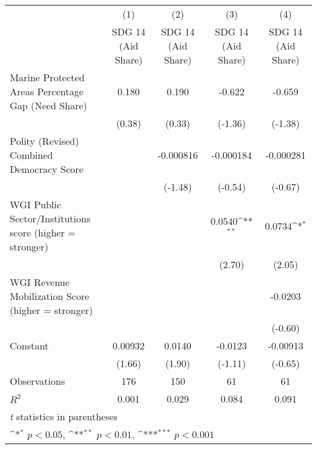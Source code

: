 {
\def\sym#1{\ifmmode^{#1}\else\(^{#1}\)\fi}
\begin{tabular}{l*{4}{c}}
\hline\hline
                &\multicolumn{1}{c}{(1)}&\multicolumn{1}{c}{(2)}&\multicolumn{1}{c}{(3)}&\multicolumn{1}{c}{(4)}\\
                &\multicolumn{1}{c}{SDG 14 (Aid Share)}&\multicolumn{1}{c}{SDG 14 (Aid Share)}&\multicolumn{1}{c}{SDG 14 (Aid Share)}&\multicolumn{1}{c}{SDG 14 (Aid Share)}\\
\hline
Marine Protected Areas Percentage Gap (Need Share)&    0.180         &    0.190         &   -0.622         &   -0.659         \\
                &   (0.38)         &   (0.33)         &  (-1.36)         &  (-1.38)         \\
[1em]
Polity (Revised) Combined Democracy Score&                  &-0.000816         &-0.000184         &-0.000281         \\
                &                  &  (-1.48)         &  (-0.54)         &  (-0.67)         \\
[1em]
WGI Public Sector/Institutions score (higher = stronger)&                  &                  &   0.0540\sym{**} &   0.0734\sym{*}  \\
                &                  &                  &   (2.70)         &   (2.05)         \\
[1em]
WGI Revenue Mobilization Score (higher = stronger)&                  &                  &                  &  -0.0203         \\
                &                  &                  &                  &  (-0.60)         \\
[1em]
Constant        &  0.00932         &   0.0140         &  -0.0123         & -0.00913         \\
                &   (1.66)         &   (1.90)         &  (-1.11)         &  (-0.65)         \\
\hline
Observations    &      176         &      150         &       61         &       61         \\
\(R^{2}\)       &    0.001         &    0.029         &    0.084         &    0.091         \\
\hline\hline
\multicolumn{5}{l}{\footnotesize \textit{t} statistics in parentheses}\\
\multicolumn{5}{l}{\footnotesize \sym{*} \(p<0.05\), \sym{**} \(p<0.01\), \sym{***} \(p<0.001\)}\\
\end{tabular}
}
